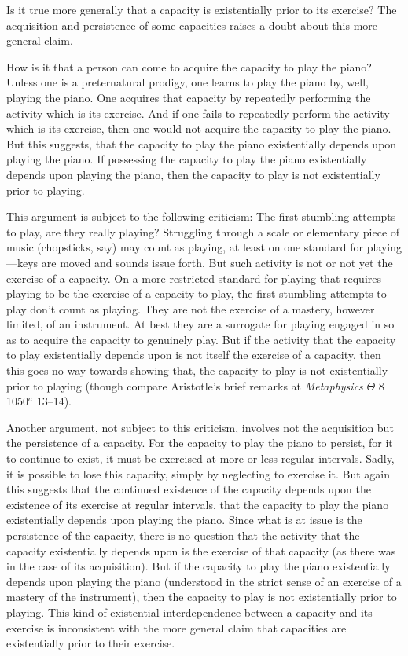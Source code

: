 \documentclass[12pt]{article}
\begin{document}
Is it true more generally that a capacity is existentially prior to its exercise? The acquisition and persistence of some capacities raises a doubt about this more general claim.

How is it that a person can come to acquire the capacity to play the piano? Unless one is a preternatural prodigy, one learns to play the piano by, well, playing the piano. One acquires that capacity by repeatedly performing the activity which is its exercise. And if one fails to repeatedly perform the activity which is its exercise, then one would not acquire the capacity to play the piano. But this suggests, that the capacity to play the piano existentially depends upon playing the piano. If possessing the capacity to play the piano existentially depends upon playing the piano, then the capacity to play is not existentially prior to playing. 

This argument is subject to the following criticism: The first stumbling attempts to play, are they really playing? Struggling through a scale or elementary piece of music (chopsticks, say) may count as playing, at least on one standard for playing---keys are moved and sounds issue forth. But such activity is not or not yet the exercise of a capacity. On a more restricted standard for playing that requires playing to be the exercise of a capacity to play, the first stumbling attempts to play don't count as playing. They are not the exercise of a mastery, however limited, of an instrument. At best they are a surrogate for playing engaged in so as to acquire the capacity to genuinely play. But if the activity that the capacity to play existentially depends upon is not itself the exercise of a capacity, then this goes no way towards showing that, the capacity to play is not existentially prior to playing (though compare Aristotle's brief remarks at \emph{Metaphysics} \( \Theta \) 8 1050\( ^{a} \) 13--14).

Another argument, not subject to this criticism, involves not the acquisition but the persistence of a capacity. For the capacity to play the piano to persist, for it to continue to exist, it must be exercised at more or less regular intervals. Sadly, it is possible to lose this capacity, simply by neglecting to exercise it. But again this suggests that the continued existence of the capacity depends upon the existence of its exercise at regular intervals, that the capacity to play the piano existentially depends upon playing the piano. Since what is at issue is the persistence of the capacity, there is no question that the activity that the capacity existentially depends upon is the exercise of that capacity (as there was in the case of its acquisition). But if the capacity to play the piano existentially depends upon playing the piano (understood in the strict sense of an exercise of a mastery of the instrument), then the capacity to play is not existentially prior to playing. This kind of existential interdependence between a capacity and its exercise is inconsistent with the more general claim that capacities are existentially prior to their exercise.
\end{document}
